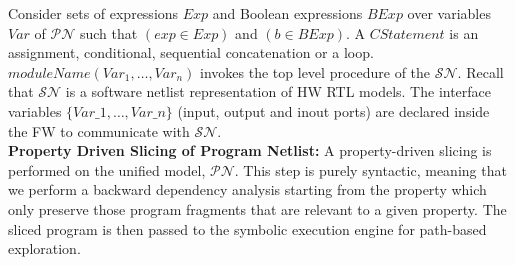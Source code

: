 \documentclass[sigconf]{acmart}
\newcommand{\tool}[1]{\textsc{#1}\xspace}
\newcommand{\verifox}{\tool{VerifOx}}
\newcommand{\Omit}[1]{}
\begin{document}
Consider sets of expressions $Exp$ and Boolean expressions $BExp$ 
over variables $Var$ of $\mathcal{PN}$ such that $(exp \in Exp)$ and 
$(b \in BExp)$. A $\mathit{CStatement}$ is an assignment,
conditional, sequential concatenation or a loop.
$\mathit{moduleName(Var_1,\dots,Var_n)}$ invokes the top level 
procedure of the $\mathcal{SN}$. Recall that $\mathcal{SN}$ is a
software netlist representation of HW RTL models.
The interface variables $\{Var\_1,\dots,Var\_n\}$ 
(input, output and inout ports) are declared inside the 
FW to communicate with $\mathcal{SN}$. \\ 
\Omit{
$\mathcal{PN}$ is verification equivalent 
to the concurrent execution of FW and $\mathcal{SN}$.
}
\textbf{Property Driven Slicing of Program Netlist:}
A property-driven slicing is performed on the unified model, $\mathcal{PN}$.  
This step is purely syntactic, meaning that we perform a backward dependency 
analysis starting from the property which only preserve those 
program fragments that are relevant to a given property. The sliced program 
is then passed to the symbolic execution engine for path-based exploration. 
\Omit{
\section{Extracting relevant FW/HW interactions using}
Our unified FW-HW model, $\mathcal{PN}$, is composed of a set of 
FW scenarios, $\{\mathcal{S}\}$, and a set of HW transactions, $\{\mathcal{T}\}$ 
that $\{\mathcal{S}\}$ depends on. However, only a subset of $\{\mathcal{T}\}$ is 
relevant for a particular $\mathcal{S}_i \in \mathcal{S}$. In this section, 
we present a path-based exploration algorithm to automatically infer 
interacting $\mathcal{S}/\mathcal{T}$ pairs from $\mathcal{PN}$. 
}
\end{document}
